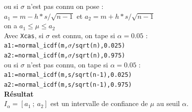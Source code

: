 \documentclass[a4paper,11pt]{book}
\begin{document}
ou si $\sigma$ n'est pas connu  on pose :\\
$a_1=m-h*s/\sqrt{n-1}$ et $a_2=m+h*s/\sqrt{n-1}$\\
on a $a_1 \leq \mu \leq a_2$\\
Avec {\tt Xcas}, si $\sigma$ est connu, on tape si $\alpha=0.05$ :\\
{\tt a1:=normal\_icdf(m,$\sigma$/sqrt(n),0.025)}\\
{\tt a2:=normal\_icdf(m,$\sigma$/sqrt(n),0.975)}\\
ou si $\sigma$ n'est pas connu, on tape si $\alpha=0.05$ :\\
{\tt a1:=normal\_icdf(m,s/sqrt(n-1),0.025)}\\
{\tt a2:=normal\_icdf(m,s/sqrt(n-1),0.975)}\\
{\bf R\'esultat}\\
$I_{\alpha}=[a_1\ ;\ a_2]$ est un intervalle de confiance de $\mu$ au seuil
 $\alpha$.\\
\end{document}
